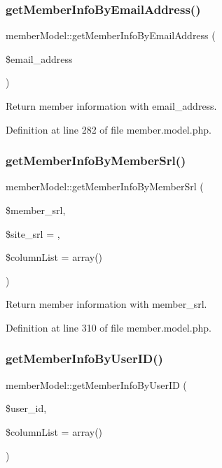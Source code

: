 \subsubsection{\texorpdfstring{get\+Member\+Info\+By\+Email\+Address()}{getMemberInfoByEmailAddress()}}
{\footnotesize\ttfamily member\+Model\+::get\+Member\+Info\+By\+Email\+Address (\begin{DoxyParamCaption}\item[{}]{\$email\+\_\+address }\end{DoxyParamCaption})}



Return member information with email\+\_\+address. 



Definition at line 282 of file member.\+model.\+php.

\mbox{\label{classmemberModel_a24b024c02da695d9a7b7bce7b3e84135}} 
\subsubsection{\texorpdfstring{get\+Member\+Info\+By\+Member\+Srl()}{getMemberInfoByMemberSrl()}}
{\footnotesize\ttfamily member\+Model\+::get\+Member\+Info\+By\+Member\+Srl (\begin{DoxyParamCaption}\item[{}]{\$member\+\_\+srl,  }\item[{}]{\$site\+\_\+srl = {},  }\item[{}]{\$column\+List = {\ttfamily array()} }\end{DoxyParamCaption})}



Return member information with member\+\_\+srl. 



Definition at line 310 of file member.\+model.\+php.

\mbox{\label{classmemberModel_a51229368446fed60d67d3349a0ac305c}} 
\subsubsection{\texorpdfstring{get\+Member\+Info\+By\+User\+I\+D()}{getMemberInfoByUserID()}}
{\footnotesize\ttfamily member\+Model\+::get\+Member\+Info\+By\+User\+ID (\begin{DoxyParamCaption}\item[{}]{\$user\+\_\+id,  }\item[{}]{\$column\+List = {\ttfamily array()} }\end{DoxyParamCaption})}



